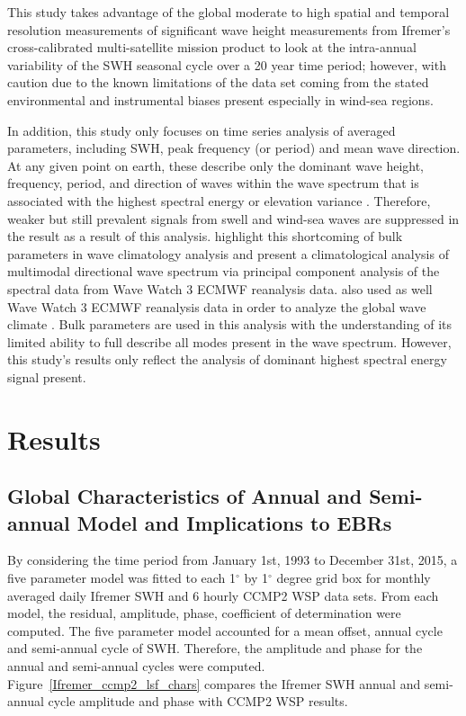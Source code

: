 \documentclass[draft,linenumbers]{agujournal2018}
\begin{document}

This study takes advantage of the global moderate to high spatial and temporal resolution measurements of significant wave height measurements from Ifremer's cross-calibrated multi-satellite mission product to look at the intra-annual variability of the SWH seasonal cycle over a 20 year time period; however, with caution due to the known limitations of the data set coming from the stated environmental and instrumental biases present especially in wind-sea regions.

In addition, this study only focuses on time series analysis of averaged parameters, including SWH, peak frequency (or period) and mean wave direction.   At any given point on earth, these describe only the dominant wave height, frequency, period, and direction of waves within the wave spectrum that is associated with the highest spectral energy or elevation variance \cite{ardhuin2015ocean}. Therefore, weaker but still prevalent signals from swell and wind-sea waves are suppressed in the result as a result of this analysis. \citet{echevarria2019seasonal} highlight this shortcoming of bulk parameters in wave climatology analysis and present a climatological analysis of multimodal directional wave spectrum via principal component analysis of the spectral data from Wave Watch 3 ECMWF reanalysis data. \citet{semedo2011global} also used as well Wave Watch 3 ECMWF reanalysis data in order to analyze the global wave climate . Bulk parameters are used in this analysis with the understanding of its limited ability to full describe all modes present in the wave spectrum. However, this study's results only reflect the analysis of dominant highest spectral energy signal present.

\section{Results}

\subsection{Global Characteristics of Annual and Semi-annual Model and Implications to EBRs}

By considering the time period from January 1st, 1993 to December 31st, 2015, a five parameter model was fitted to each 1$^{\circ}$ by 1$^{\circ}$ degree grid box for monthly averaged daily Ifremer SWH and 6 hourly CCMP2 WSP data sets. From each model, the residual, amplitude, phase, coefficient of determination were computed. The five parameter model accounted for a mean offset, annual cycle and semi-annual cycle of SWH. Therefore, the amplitude and phase for the annual and semi-annual cycles were computed. Figure~\ref{Ifremer_ccmp2_lsf_chars} compares the Ifremer SWH annual and semi-annual cycle amplitude and phase with CCMP2 WSP results.
\end{document}
